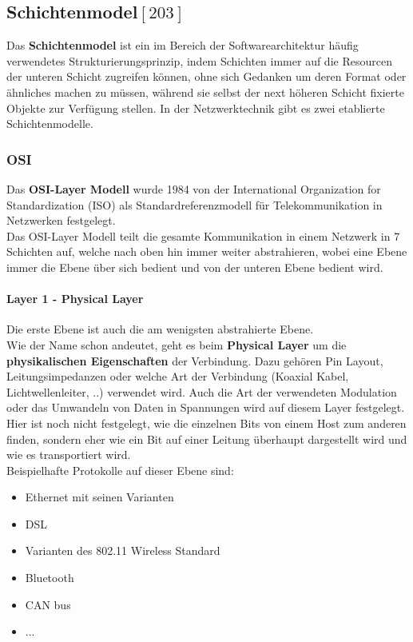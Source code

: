 \documentclass[12pt,a4paper]{report}
\begin{document}
\begin{onehalfspace}
\subsection*{Schichtenmodel${[203]}$}
Das \textbf{Schichtenmodel} ist ein im Bereich der Softwarearchitektur häufig verwendetes Strukturierungsprinzip, indem Schichten immer auf die Resourcen der unteren Schicht zugreifen können, ohne sich Gedanken um deren Format oder ähnliches machen zu müssen, während sie selbst der next höheren Schicht fixierte Objekte zur Verfügung stellen. In der Netzwerktechnik gibt es zwei etablierte Schichtenmodelle.
\subsubsection{OSI}
Das \textbf{OSI-Layer Modell} wurde 1984 von der International Organization for Standardization (ISO) als Standardreferenzmodell für Telekommunikation in Netzwerken festgelegt.\\
Das OSI-Layer Modell teilt die gesamte Kommunikation in einem Netzwerk in 7 Schichten auf, welche nach oben hin immer weiter abstrahieren, wobei eine Ebene immer die Ebene über sich bedient und von der unteren Ebene bedient wird.\\
\paragraph{Layer 1 - Physical Layer}
Die erste Ebene ist auch die am wenigsten abstrahierte Ebene.\\
Wie der Name schon andeutet, geht es beim \textbf{Physical Layer} um die \textbf{physikalischen Eigenschaften} der Verbindung. Dazu gehören Pin Layout, Leitungsimpedanzen oder welche Art der Verbindung (Koaxial Kabel, Lichtwellenleiter, ..) verwendet wird. Auch die Art der verwendeten Modulation oder das Umwandeln von Daten in Spannungen wird auf diesem Layer festgelegt.\\
Hier ist noch nicht festgelegt, wie die einzelnen Bits von einem Host zum anderen finden, sondern eher wie ein Bit auf einer Leitung überhaupt dargestellt wird und wie es transportiert wird.\\

Beispielhafte Protokolle auf dieser Ebene sind:
\begin{itemize}
\item Ethernet mit seinen Varianten
\item DSL 
\item Varianten des 802.11 Wireless Standard
\item Bluetooth
\item CAN bus
\item ...
\end{itemize}

\end{onehalfspace}
\end{document}
